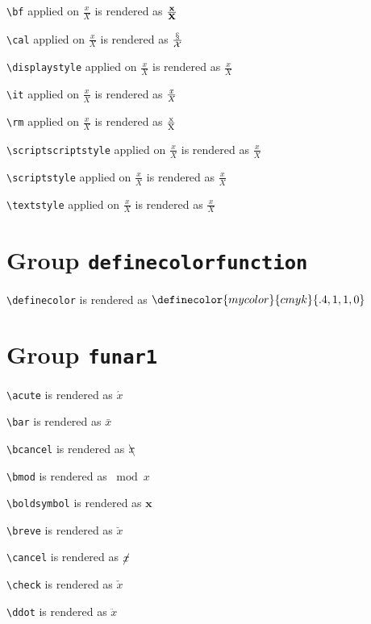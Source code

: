 \texttt{\textbackslash bf} applied on $\frac{x}{X}$ is rendered as ${\bf \frac{x}{X}}$

\texttt{\textbackslash cal} applied on $\frac{x}{X}$ is rendered as ${\cal \frac{x}{X}}$

\texttt{\textbackslash displaystyle} applied on $\frac{x}{X}$ is rendered as ${\displaystyle \frac{x}{X}}$

\texttt{\textbackslash it} applied on $\frac{x}{X}$ is rendered as ${\it \frac{x}{X}}$

\texttt{\textbackslash rm} applied on $\frac{x}{X}$ is rendered as ${\rm \frac{x}{X}}$

\texttt{\textbackslash scriptscriptstyle} applied on $\frac{x}{X}$ is rendered as ${\scriptscriptstyle \frac{x}{X}}$

\texttt{\textbackslash scriptstyle} applied on $\frac{x}{X}$ is rendered as ${\scriptstyle \frac{x}{X}}$

\texttt{\textbackslash textstyle} applied on $\frac{x}{X}$ is rendered as ${\textstyle \frac{x}{X}}$

\section{ Group \texttt{definecolor\textunderscore function}}

\texttt{\textbackslash definecolor} is rendered as $\definecolor{mycolor}{cmyk}{.4,1,1,0}$

\section{ Group \texttt{fun\textunderscore ar1}}

\texttt{\textbackslash acute} is rendered as $\acute{x}$

\texttt{\textbackslash bar} is rendered as $\bar{x}$

\texttt{\textbackslash bcancel} is rendered as $\bcancel{x}$

\texttt{\textbackslash bmod} is rendered as $\bmod{x}$

\texttt{\textbackslash boldsymbol} is rendered as $\boldsymbol{x}$

\texttt{\textbackslash breve} is rendered as $\breve{x}$

\texttt{\textbackslash cancel} is rendered as $\cancel{x}$

\texttt{\textbackslash check} is rendered as $\check{x}$

\texttt{\textbackslash ddot} is rendered as $\ddot{x}$

